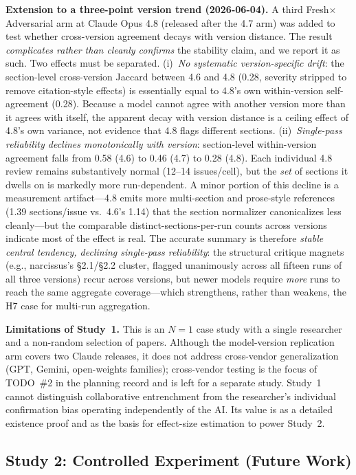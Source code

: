 \documentclass[12pt]{article}
\begin{document}
\textbf{Extension to a three-point version trend (2026-06-04).} A third Fresh$\times$Adversarial arm at Claude Opus 4.8 (released after the 4.7 arm) was added to test whether cross-version agreement decays with version distance. The result \emph{complicates rather than cleanly confirms} the stability claim, and we report it as such. Two effects must be separated. (i)~\emph{No systematic version-specific drift}: the section-level cross-version Jaccard between 4.6 and 4.8 (0.28, severity stripped to remove citation-style effects) is essentially equal to 4.8's own within-version self-agreement (0.28). Because a model cannot agree with another version more than it agrees with itself, the apparent decay with version distance is a ceiling effect of 4.8's own variance, not evidence that 4.8 flags different sections. (ii)~\emph{Single-pass reliability declines monotonically with version}: section-level within-version agreement falls from 0.58 (4.6) to 0.46 (4.7) to 0.28 (4.8). Each individual 4.8 review remains substantively normal (12--14 issues/cell), but the \emph{set} of sections it dwells on is markedly more run-dependent. A minor portion of this decline is a measurement artifact---4.8 emits more multi-section and prose-style references (1.39 sections/issue vs.\ 4.6's 1.14) that the section normalizer canonicalizes less cleanly---but the comparable distinct-sections-per-run counts across versions indicate most of the effect is real. The accurate summary is therefore \emph{stable central tendency, declining single-pass reliability}: the structural critique magnets (e.g., narcissus's §2.1/§2.2 cluster, flagged unanimously across all fifteen runs of all three versions) recur across versions, but newer models require \emph{more} runs to reach the same aggregate coverage---which strengthens, rather than weakens, the H7 case for multi-run aggregation.

\textbf{Limitations of Study~1.} This is an $N{=}1$ case study with a single researcher and a non-random selection of papers. Although the model-version replication arm covers two Claude releases, it does not address cross-vendor generalization (GPT, Gemini, open-weights families); cross-vendor testing is the focus of TODO~\#2 in the planning record and is left for a separate study. Study~1 cannot distinguish collaborative entrenchment from the researcher's individual confirmation bias operating independently of the AI. Its value is as a detailed existence proof and as the basis for effect-size estimation to power Study~2.

\subsection{Study 2: Controlled Experiment (Future Work)}
\label{sec:study2}
\end{document}
